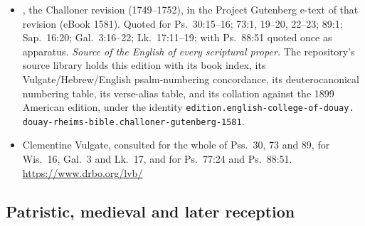 \begin{itemize}[leftmargin=1.2em, itemsep=0.15em]
\item {}, the Challoner revision
(1749--1752), in the Project Gutenberg e-text of that revision (eBook 1581).
Quoted for Ps.\ 30:15--16; 73:1, 19--20, 22--23; 89:1; Sap.\ 16:20; Gal.\
3:16--22; Lk.\ 17:11--19; with Ps.\ 88:51 quoted once as apparatus.
\textit{Source of the English of every scriptural proper.} The repository's
source library holds this edition with its book index, its
Vulgate/Hebrew/English psalm-numbering concordance, its deuterocanonical
numbering table, its verse-alias table, and its collation against the 1899
American edition, under the identity
\texttt{edition.english-college-of-douay.\allowbreak
douay-rheims-bible.\allowbreak challoner-gutenberg-1581}.
\item Clementine Vulgate, consulted for the whole of Pss.\ 30, 73 and 89, for
Wis.\ 16, Gal.\ 3 and Lk.\ 17, and for Ps.\ 77:24 and Ps.\ 88:51.
\url{https://www.drbo.org/lvb/}
\end{itemize}

\subsection*{Patristic, medieval and later reception}

